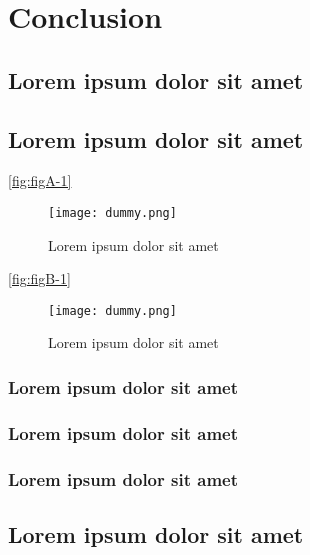 \chapter{Conclusion}

\section{Lorem ipsum dolor sit amet}

\lipsum[1-3]

\section{Lorem ipsum dolor sit amet}

\lipsum[1-1] \ref{fig:figA-1}

\begin{figure}[H]
    \centering
    \texttt{[image: dummy.png]}
    \caption{Lorem ipsum dolor sit amet}
    \label{fig:figA-6}
\end{figure}

\lipsum[1-1] \ref{fig:figB-1}

\begin{figure}[H]
    \centering
    \texttt{[image: dummy.png]}
    \caption{Lorem ipsum dolor sit amet}
    \label{fig:figB-6}
\end{figure}

\subsection{Lorem ipsum dolor sit amet}

\lipsum[1-1] \cite{reference-1}

\subsection{Lorem ipsum dolor sit amet}

\lipsum[1-1] \cite{reference-2}

\subsection{Lorem ipsum dolor sit amet}

\lipsum[1-1] \cite{reference-3}

\section{Lorem ipsum dolor sit amet}

